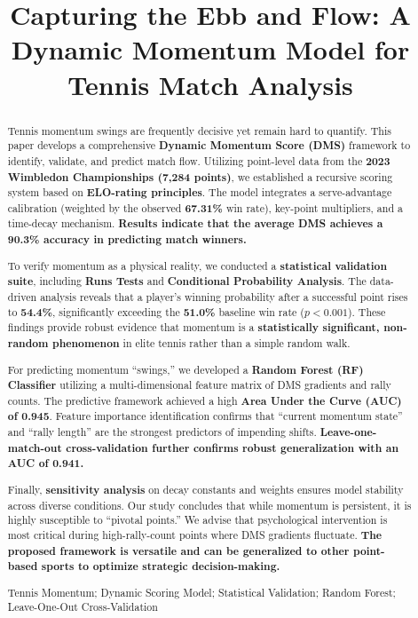 \documentclass{mcmthesis}
\title{Capturing the Ebb and Flow: A Dynamic Momentum Model for Tennis Match Analysis}
\begin{document}
\begin{abstract}
\setlength{\parindent}{1.5em}

Tennis momentum swings are frequently decisive yet remain hard to quantify. This paper develops a comprehensive \textbf{Dynamic Momentum Score (DMS)} framework to identify, validate, and predict match flow. Utilizing point-level data from the \textbf{2023 Wimbledon Championships (7,284 points)}, we established a recursive scoring system based on \textbf{ELO-rating principles}. The model integrates a serve-advantage calibration (weighted by the observed \textbf{67.31\%} win rate), key-point multipliers, and a time-decay mechanism. \textbf{Results indicate that the average DMS achieves a 90.3\% accuracy in predicting match winners.}

To verify momentum as a physical reality, we conducted a \textbf{statistical validation suite}, including \textbf{Runs Tests} and \textbf{Conditional Probability Analysis}. The data-driven analysis reveals that a player's winning probability after a successful point rises to \textbf{54.4\%}, significantly exceeding the \textbf{51.0\%} baseline win rate (\textbf{$p < 0.001$}). These findings provide robust evidence that momentum is a \textbf{statistically significant, non-random phenomenon} in elite tennis rather than a simple random walk.

For predicting momentum ``swings,'' we developed a \textbf{Random Forest (RF) Classifier} utilizing a multi-dimensional feature matrix of DMS gradients and rally counts. The predictive framework achieved a high \textbf{Area Under the Curve (AUC) of 0.945}. Feature importance identification confirms that ``current momentum state'' and ``rally length'' are the strongest predictors of impending shifts. \textbf{Leave-one-match-out cross-validation further confirms robust generalization with an AUC of 0.941.}

Finally, \textbf{sensitivity analysis} on decay constants and weights ensures model stability across diverse conditions. Our study concludes that while momentum is persistent, it is highly susceptible to ``pivotal points.'' We advise that psychological intervention is most critical during high-rally-count points where DMS gradients fluctuate. \textbf{The proposed framework is versatile and can be generalized to other point-based sports to optimize strategic decision-making.}

\begin{keywords}
Tennis Momentum; Dynamic Scoring Model; Statistical Validation; Random Forest; Leave-One-Out Cross-Validation
\end{keywords}
\end{abstract}
\maketitle
\setcounter{page}{2}
\tableofcontents
\newpage
\end{document}
